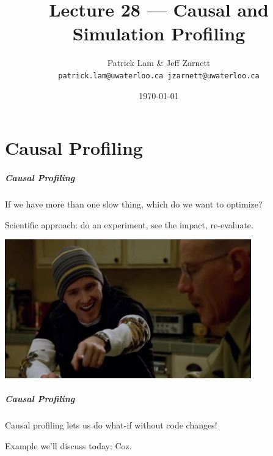 
\usepackage{soul}

\title{Lecture 28 --- Causal and Simulation Profiling }

\author{Patrick Lam \& Jeff Zarnett \\ \small \texttt{patrick.lam@uwaterloo.ca jzarnett@uwaterloo.ca}}
\date{\today}




\begin{frame}
  \titlepage
 \end{frame}

\part{Causal Profiling}

\begin{frame}
	\partpage
\end{frame}

\begin{frame}
\frametitle{Causal Profiling}

If we have more than one slow thing, which do we want to optimize?

Scientific approach: do an experiment, see the impact, re-evaluate.

\begin{center}
	\includegraphics[width=0.8\textwidth]{images/yeah_science.jpg}
\end{center}

\end{frame}


\begin{frame}
\frametitle{Causal Profiling}

Causal profiling lets us do what-if without code changes!

Example we'll discuss today: \alert{Coz}.


\end{frame}


